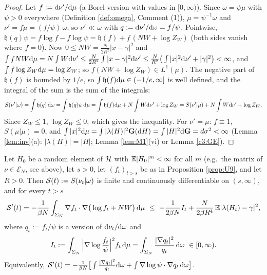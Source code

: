 \begin{proof}
Let $f:=\mathrm{d}\nu'/\mathrm{d}\mu$ (a Borel version with values in $[0,\infty)$). Since $\omega=\psi\mu$ with $\psi>0$ everywhere (Definition \ref{def:omega}, Comment (1)), $\mu=\psi^{-1}\omega$ and $\nu'=f\mu=(f/\psi)\,\omega$; so $\nu'\ll\omega$ with $q:=\mathrm{d}\nu'/\mathrm{d}\omega=f/\psi$.
Pointwise, $\mathfrak h(q)\psi=f\log f-f\log\psi=\mathfrak h(f)+f\,(NW+\log Z_W)$ (both sides vanish where $f=0$). Now $0\le NW=\frac N{2R^2}|x-\gamma|^2$ and $\int fNW\mathrm{d}\mu=N\int W\mathrm{d}\nu'\le\frac N{2R^2}\int|x-\gamma|^2\mathrm{d}\nu'\le\frac N{R^2}\big(\int|x|^2\mathrm{d}\nu'+|\gamma|^2\big)<\infty$, and $\int f\log Z_W\mathrm{d}\mu=\log Z_W$; so $f(NW+\log Z_W)\in L^1(\mu)$.
The negative part of $\mathfrak h(f)$ is bounded by $1/e$, so $\int\mathfrak h(f)\mathrm{d}\mu\in(-1/e,\infty]$ is well defined, and the integral of the sum is the sum of the integrals:
\[
S(\nu'|\omega)=\int\mathfrak h(q)\,\mathrm{d}\omega=\int\mathfrak h(q)\psi\,\mathrm{d}\mu=\int\mathfrak h(f)\mathrm{d}\mu+N\int W\mathrm{d}\nu'+\log Z_W=S(\nu'|\mu)+N\int W\mathrm{d}\nu'+\log Z_W .
\]
Since $Z_W\le1$, $\log Z_W\le0$, which gives the inequality. For $\nu'=\mu$: $f\equiv1$, $S(\mu|\mu)=0$, and $\int|x|^2\mathrm{d}\mu=\int|\lambda(H)|^2\mathbf{G}(\mathrm{d} H)=\int|H|^2\mathrm{d}\mathbf{G}=d\sigma^2<\infty$ (Lemma \ref{lem:inv}(a): $|\lambda(H)|=|H|$; Lemma \ref{lem:M1}(vi) or Lemma \ref{c3:GE}).
\end{proof}

\begin{proposition}\label{prop:entprod}
Let $H_0$ be a random element of $\mathcal{H}$ with $\mathbb{E}|H_0|^m<\infty$ for all $m$ (e.g.\ the matrix of $\nu\in\mathcal E_N$, see above), let $s>0$, let $(f_t)_{t>s}$ be as in Proposition \ref{prop:U9}, and let $R>0$. Then $\mathcal{S}(t):=S(\nu_t|\omega)$ is finite and continuously differentiable on $(s,\infty)$, and for every $t>s$
\begin{equation}\label{entprod}
\mathcal{S}'(t)=-\frac1{\beta N}\int_{\Sigma_N}\nabla f_t\cdot\nabla\big(\log f_t+NW\big)\,\mathrm{d}\mu\ \le\ -\frac1{2\beta N}I_t+\frac{N}{2\beta R^4}\,\mathbb{E}|\lambda(H_t)-\gamma|^2,
\end{equation}
where $q_t:=f_t/\psi$ is a version of $\mathrm{d}\nu_t/\mathrm{d}\omega$ and
\[
I_t:=\int_{\Sigma_N}\Big|\nabla\log\frac{f_t}{\psi}\Big|^2f_t\,\mathrm{d}\mu=\int_{\Sigma_N}\frac{|\nabla q_t|^2}{q_t}\,\mathrm{d}\omega\ \in[0,\infty).
\]
Equivalently, $\mathcal{S}'(t)=-\frac1{\beta N}\big[\int\frac{|\nabla q_t|^2}{q_t}\mathrm{d}\omega+\int\nabla\log\psi\cdot\nabla q_t\,\mathrm{d}\omega\big]$.
\end{proposition}

